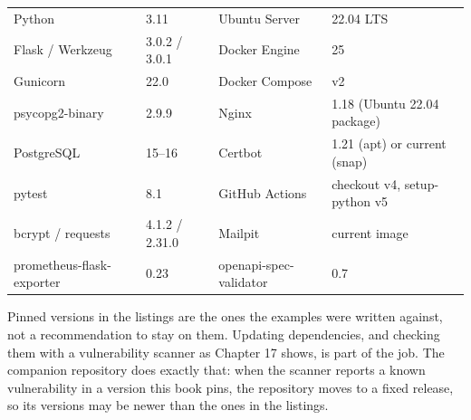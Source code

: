 \begin{center}\small
\begin{tabular}{@{}ll@{\quad}ll@{}}
\toprule
Python & 3.11 & Ubuntu Server & 22.04 LTS \\
Flask / Werkzeug & 3.0.2 / 3.0.1 & Docker Engine & 25 \\
Gunicorn & 22.0 & Docker Compose & v2 \\
psycopg2-binary & 2.9.9 & Nginx & 1.18 (Ubuntu 22.04 package) \\
PostgreSQL & 15–16 & Certbot & 1.21 (apt) or current (snap) \\
pytest & 8.1 & GitHub Actions & checkout v4, setup-python v5 \\
bcrypt / requests & 4.1.2 / 2.31.0 & Mailpit & current image \\
prometheus-flask-exporter & 0.23 & openapi-spec-validator & 0.7 \\
\bottomrule
\end{tabular}
\end{center}

Pinned versions in the listings are the ones the examples were written against, not a
recommendation to stay on them. Updating dependencies, and checking them with a vulnerability
scanner as Chapter 17 shows, is part of the job. The companion repository does exactly that: when
the scanner reports a known vulnerability in a version this book pins, the repository moves to a
fixed release, so its versions may be newer than the ones in the listings.
